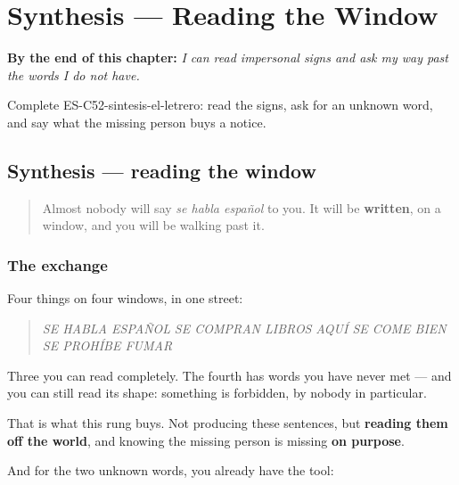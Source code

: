 
\chapter{Synthesis --- Reading the Window}
\label{ch:synthesis-se}

\begin{chapteropening}
\textbf{By the end of this chapter:} \emph{I can read impersonal signs and ask my way past the words I do not have.}

Complete ES-C52-sintesis-el-letrero: read the signs, ask for an unknown word, and say what the missing person buys a notice.
\end{chapteropening}

\section[Practice]{Synthesis — reading the window}

\label{lesson:ES-C52-sintesis-el-letrero}



\begin{quote}
Almost nobody will say \emph{se habla español} to you. It will be \textbf{written}, on a window, and you will be walking past it.
\end{quote}

\subsection*{The exchange}
Four things on four windows, in one street:

\begin{quote}
\emph{SE HABLA ESPAÑOL} \emph{SE COMPRAN LIBROS} \emph{AQUÍ SE COME BIEN} \emph{SE PROHÍBE FUMAR}
\end{quote}

Three you can read completely. The fourth has words you have never met — and you can still read its shape: something is forbidden, by nobody in particular.

That is what this rung buys. Not producing these sentences, but \textbf{reading them off the world}, and knowing the missing person is missing \textbf{on purpose}.

And for the two unknown words, you already have the tool:

